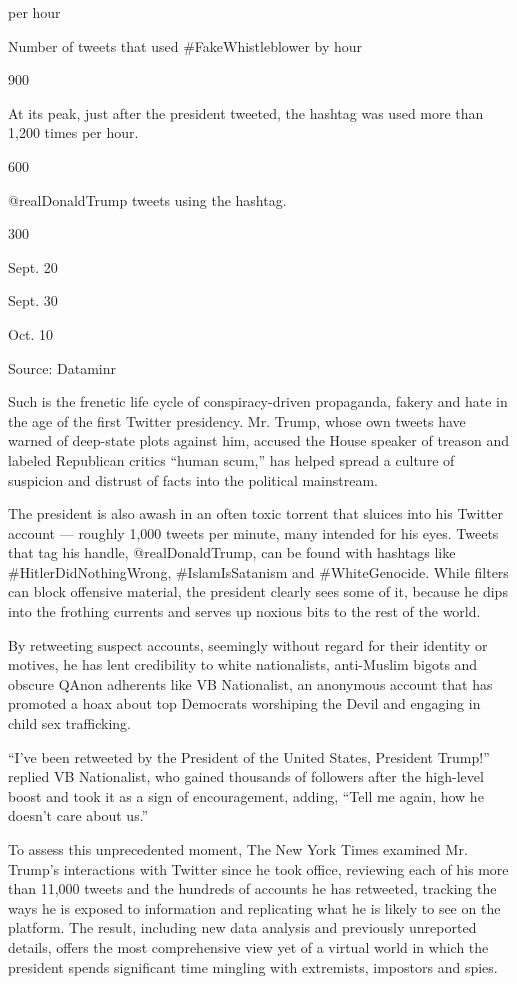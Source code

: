 per hour

Number of tweets that used \#FakeWhistleblower by hour

900

At its peak, just after the president tweeted, the hashtag was used more
than 1,200 times per hour.

600

@realDonaldTrump tweets using the hashtag.

300

Sept. 20

Sept. 30

Oct. 10

Source: Dataminr

Such is the frenetic life cycle of conspiracy-driven propaganda, fakery
and hate in the age of the first Twitter presidency. Mr. Trump, whose
own tweets have warned of deep-state plots against him, accused the
House speaker of treason and labeled Republican critics ``human scum,''
has helped spread a culture of suspicion and distrust of facts into the
political mainstream.

The president is also awash in an often toxic torrent that sluices into
his Twitter account --- roughly 1,000 tweets per minute, many intended
for his eyes. Tweets that tag his handle, @realDonaldTrump, can be found
with hashtags like \#HitlerDidNothingWrong, \#IslamIsSatanism and
\#WhiteGenocide. While filters can block offensive material, the
president clearly sees some of it, because he dips into the frothing
currents and serves up noxious bits to the rest of the world.

By retweeting suspect accounts, seemingly without regard for their
identity or motives, he has lent credibility to white nationalists,
anti-Muslim bigots and obscure QAnon adherents like VB Nationalist, an
anonymous account that has promoted a hoax about top Democrats
worshiping the Devil and engaging in child sex trafficking.

``I've been retweeted by the President of the United States, President
Trump!'' replied VB Nationalist, who gained thousands of followers after
the high-level boost and took it as a sign of encouragement, adding,
``Tell me again, how he doesn't care about us.''

To assess this unprecedented moment, The New York Times examined Mr.
Trump's interactions with Twitter since he took office, reviewing each
of his more than 11,000 tweets and the hundreds of accounts he has
retweeted, tracking the ways he is exposed to information and
replicating what he is likely to see on the platform. The result,
including new data analysis and previously unreported details, offers
the most comprehensive view yet of a virtual world in which the
president spends significant time mingling with extremists, impostors
and spies.

